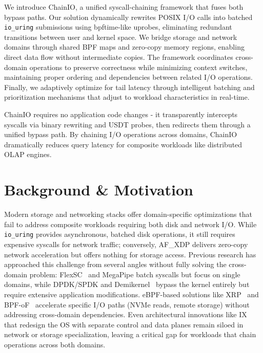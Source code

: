 \documentclass[sigconf,10pt]{acmart}
\newcommand{\sys}{ChainIO\xspace}
\begin{document}
We introduce \sys, a unified syscall-chaining framework that fuses both bypass paths. Our solution dynamically rewrites POSIX I/O calls into batched \texttt{io\_uring} submissions using bpftime-like uprobes, eliminating redundant transitions between user and kernel space. We bridge storage and network domains through shared BPF maps and zero-copy memory regions, enabling direct data flow without intermediate copies. The framework coordinates cross-domain operations to preserve correctness while minimizing context switches, maintaining proper ordering and dependencies between related I/O operations. Finally, we adaptively optimize for tail latency through intelligent batching and prioritization mechanisms that adjust to workload characteristics in real-time.

\sys requires no application code changes - it transparently intercepts syscalls via binary rewriting and USDT probes, then redirects them through a unified bypass path. By chaining I/O operations across domains, \sys dramatically reduces query latency for composite workloads like distributed OLAP engines.

\section{Background \& Motivation}\label{sec:motivation}

Modern storage and networking stacks offer domain-specific optimizations that fail to address composite workloads requiring both disk and network I/O. While \texttt{io\_uring} provides asynchronous, batched disk operations, it still requires expensive syscalls for network traffic; conversely, AF\_XDP delivers zero-copy network acceleration but offers nothing for storage access. Previous research has approached this challenge from several angles without fully solving the cross-domain problem: FlexSC~\cite{flexsc} and MegaPipe batch syscalls but focus on single domains, while DPDK/SPDK and Demikernel~\cite{zhang2021demikernel} bypass the kernel entirely but require extensive application modifications. eBPF-based solutions like XRP~\cite{Zhong22} and BPF-oF~\cite{zarkadas2023bpf} accelerate specific I/O paths (NVMe reads, remote storage) without addressing cross-domain dependencies. Even architectural innovations like IX~\cite{ix} that redesign the OS with separate control and data planes remain siloed in network or storage specialization, leaving a critical gap for workloads that chain operations across both domains.
\end{document}
